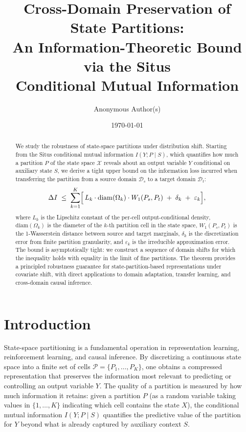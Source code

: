 \documentclass[12pt,a4paper]{article}
\title{\bfseries Cross-Domain Preservation of State Partitions:\\
An Information-Theoretic Bound via the Situs\\
Conditional Mutual Information}
\author{Anonymous Author(s)}
\date{\today}
\newcommand{\cX}{\mathcal{X}}
\newcommand{\cP}{\mathcal{P}}
\newcommand{\cD}{\mathcal{D}}
\newcommand{\Wass}{W_1}
\newcommand{\diam}{\mathrm{diam}}
\begin{document}
\maketitle

\begin{abstract}
We study the robustness of state-space partitions under distribution shift.
Starting from the Situs conditional mutual information $I(Y;P\mid S)$, which
quantifies how much a partition $P$ of the state space $\cX$ reveals about
an output variable $Y$ conditional on auxiliary state $S$, we derive a
tight upper bound on the information loss incurred when transferring the
partition from a source domain $\cD_s$ to a target domain $\cD_t$:
\[
\Delta I \;\leq\; \sum_{k=1}^{K}
\Bigl[\,L_k\cdot\diam(\Omega_k)\cdot \Wass(P_s,P_t)
\;+\; \delta_k \;+\; \varepsilon_k \Bigr],
\]
where $L_k$ is the Lipschitz constant of the per-cell output-conditional
density, $\diam(\Omega_k)$ is the diameter of the $k$-th partition cell
in the state space, $\Wass(P_s,P_t)$ is the 1-Wasserstein distance between
source and target marginals, $\delta_k$ is the discretization error from
finite partition granularity, and $\varepsilon_k$ is the irreducible
approximation error.  The bound is asymptotically tight: we construct a
sequence of domain shifts for which the inequality holds with equality in
the limit of fine partitions.  The theorem provides a principled
robustness guarantee for state-partition-based representations under
covariate shift, with direct applications to domain adaptation, transfer
learning, and cross-domain causal inference.
\end{abstract}

\section{Introduction}

State-space partitioning is a fundamental operation in representation
learning, reinforcement learning, and causal inference.  By discretizing
a continuous state space into a finite set of cells
$\cP=\{P_1,\dots,P_K\}$, one obtains a compressed representation that
preserves the information most relevant to predicting or controlling an
output variable $Y$.  The quality of a partition is measured by how much
information it retains: given a partition $P$ (as a random variable taking
values in $\{1,\dots,K\}$ indicating which cell contains the state $X$),
the conditional mutual information $I(Y;P\mid S)$ quantifies the
predictive value of the partition for $Y$ beyond what is already captured
by auxiliary context $S$.
\end{document}
